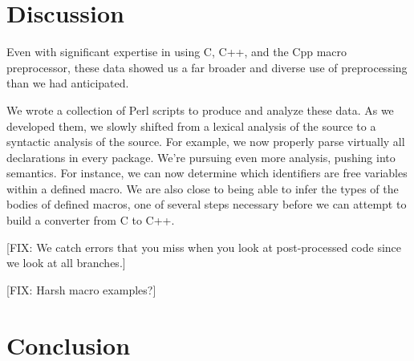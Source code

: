 
\section{Discussion}\label{sec:discussion}

Even with significant expertise in using C, C++, and the Cpp macro
preprocessor, these data showed us a far broader and diverse use of
preprocessing than we had anticipated.  

We wrote a collection of Perl scripts to produce and analyze these
data.  As we developed them, we slowly shifted from a lexical analysis
of the source to a syntactic analysis of the source.  For example, we
now properly parse virtually all declarations in every package.  We're
pursuing even more analysis, pushing into semantics.  For instance, we
can now determine which identifiers are free variables within a defined
macro.  We are also close to being able to infer the types of the bodies
of defined macros, one of several steps necessary before we can attempt
to build a converter from C to C++.

[FIX: We catch errors that you miss when you look at post-processed code
since we look at all branches.]

[FIX: Harsh macro examples?]

\section{Conclusion}\label{sec:conclusion}

\small 


